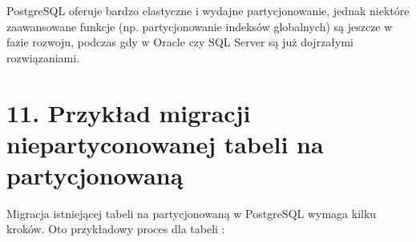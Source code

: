 \documentclass[a4paper,11pt,polish]{sphinxmanual}
\begin{document}
\sphinxAtStartPar
{}
PostgreSQL oferuje bardzo elastyczne i wydajne partycjonowanie, jednak niektóre zaawansowane funkcje (np. partycjonowanie indeksów globalnych) są jeszcze w fazie rozwoju, podczas gdy w Oracle czy SQL Server są już dojrzałymi rozwiązaniami.


\section{11. Przykład migracji niepartyconowanej tabeli na partycjonowaną}
\label{\detokenize{rozdzial_1:przyklad-migracji-niepartyconowanej-tabeli-na-partycjonowana}}
\sphinxAtStartPar
Migracja istniejącej tabeli na partycjonowaną w PostgreSQL wymaga kilku kroków. Oto przykładowy proces dla tabeli :

\sphinxAtStartPar
{}

\begin{sphinxVerbatim}[commandchars=\\\{\}]
\end{sphinxVerbatim}
\end{document}
